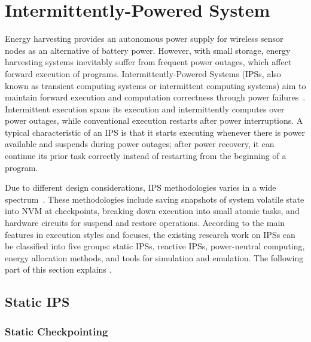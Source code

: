 \section{Intermittently-Powered System} \label{sec:ips}

Energy harvesting provides an autonomous power supply for wireless sensor nodes as an alternative of battery power. 
However, with small storage, energy harvesting systems inevitably suffer from frequent power outages, which affect forward execution of programs. 
Intermittently-Powered Systems (IPSs, also known as transient computing systems or intermittent computing systems) aim to maintain forward execution and computation correctness through power failures~\cite{ransford2012mementos}. 
Intermittent execution spans its execution and intermittently computes over power outages, while conventional execution restarts after power interruptions. 
A typical characteristic of an IPS is that it starts executing whenever there is power available and suspends during power outages; after power recovery, it can continue its prior task correctly instead of restarting from the beginning of a program. 

Due to different design considerations, IPS methodologies varies in a wide spectrum~\cite{sliper2018enabling}. 
These methodologies include saving snapshots of system volatile state into NVM at checkpoints, breaking down execution into small atomic tasks, and hardware circuits for suspend and restore operations. 
According to the main features in execution styles and focuses, the existing research work on IPSs can be classified into five groups: static IPSs, reactive IPSs, power-neutral computing, energy allocation methods, and tools for simulation and emulation. 
The following part of this section explains .

\subsection{Static IPS}


\subsubsection{Static Checkpointing}

